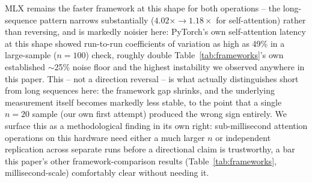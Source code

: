 \documentclass{article}
\begin{document}
\begin{table}[t]
    \centering
    \caption{Framework comparison at a genuinely different model family and regime: ViT-L/14
    (CLIP), hidden 1024, 16 heads, $D{=}64$, $L{=}257$ (real published config), Apple M5 Max. One
    representative $n{=}20$ run (mean $\pm$ 95\% CI) alongside the across-run aggregate that
    established the replicated direction (mean of independent run-means $\pm$ std.\ dev.\ across
    runs; SDPA: 8 runs, Linear: 3 runs).}
    \label{tab:vit}
\end{table}

MLX remains the faster framework at this shape for both operations -- the long-sequence pattern
narrows substantially ($4.02\times \to 1.18\times$ for self-attention) rather than reversing, and
is markedly noisier here: PyTorch's own self-attention latency at this shape showed run-to-run
coefficients of variation as high as 49\% in a large-sample ($n{=}100$) check, roughly double
Table~\ref{tab:frameworks}'s own established $\sim$25\% noise floor and the highest instability we
observed anywhere in this paper. This -- not a direction reversal -- is what actually distinguishes
short from long sequences here: the framework gap shrinks, and the underlying measurement itself
becomes markedly less stable, to the point that a single $n{=}20$ sample (our own first attempt)
produced the wrong sign entirely. We surface this as a methodological finding in its own right:
sub-millisecond attention operations on this hardware need either a much larger $n$ or independent
replication across separate runs before a directional claim is trustworthy, a bar this paper's
other framework-comparison results (Table~\ref{tab:frameworks}, millisecond-scale) comfortably
clear without needing it.
\end{document}

